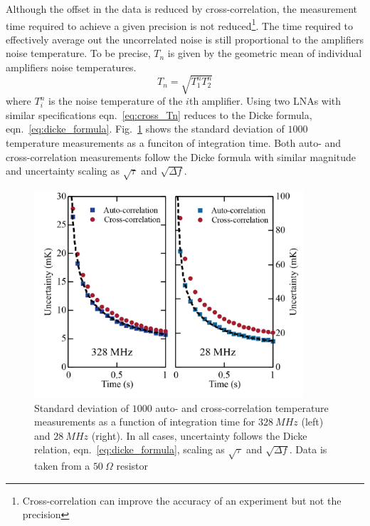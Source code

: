 Although the offset in the data is reduced by cross-correlation, the measurement time required to achieve a given precision is not reduced\footnote{Cross-correlation can improve the accuracy of an experiment but not the precision}. The time required to effectively average out the uncorrelated noise is still proportional to the amplifiers noise temperature. To be precise, $T_n$ is given by the geometric mean of individual amplifiers noise temperatures.
\begin{equation}\label{eq:cross_Tn}
T_n = \sqrt{T_1^nT_2^n}
\end{equation}
where $T_i^n$ is the noise temperature of the $i$th amplifier. Using two LNAs with similar specifications eqn.~\ref{eq:cross_Tn} reduces to the Dicke formula, eqn.~\ref{eq:dicke_formula}. Fig.~\ref{fig:cross_sensitivity} shows the standard deviation of $1000$ temperature measurements as a funciton of integration time. Both auto- and cross-correlation measurements follow the Dicke formula with similar magnitude and uncertainty scaling as $\sqrt{\tau}$ and $\sqrt{\Delta f}$.
\begin{figure}
\centering
\includegraphics[width = 100mm]{figures/Johnson_noise_thermometry/cross_sensitivity.png}
\caption{Standard deviation of $1000$ auto- and cross-correlation temperature measurements as a function of integration time for $328~MHz$ (left) and $28~MHz$ (right). In all cases, uncertainty follows the Dicke relation, eqn.~\ref{eq:dicke_formula}, scaling as $\sqrt{\tau}$ and $\sqrt{\Delta f}$. Data is taken from a $50~\Omega$ resistor}
\label{fig:cross_sensitivity}
\end{figure}
 

